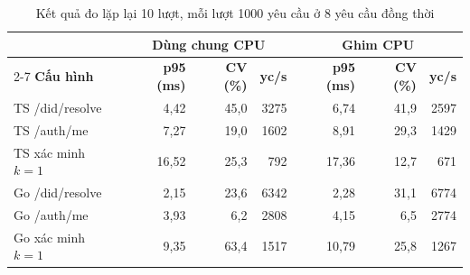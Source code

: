 \begin{table}[H]
\centering
\caption{Kết quả đo lặp lại 10 lượt, mỗi lượt 1000 yêu cầu ở 8 yêu cầu đồng thời}
\label{tab:v2-isolation}
\renewcommand{\arraystretch}{1.2}
\small
\begin{tabular}{|l|r|r|r|r|r|r|}
\hline
& \multicolumn{3}{c|}{\textbf{Dùng chung CPU}} & \multicolumn{3}{c|}{\textbf{Ghim CPU}} \\ \cline{2-7}
\textbf{Cấu hình} & \textbf{p95 (ms)} & \textbf{CV (\%)} & \textbf{yc/s} & \textbf{p95 (ms)} & \textbf{CV (\%)} & \textbf{yc/s} \\ \hline
TS /did/resolve & 4{,}42 & 45{,}0 & 3275 & 6{,}74 & 41{,}9 & 2597 \\ \hline
TS /auth/me & 7{,}27 & 19{,}0 & 1602 & 8{,}91 & 29{,}3 & 1429 \\ \hline
TS xác minh $k{=}1$ & 16{,}52 & 25{,}3 & 792 & 17{,}36 & 12{,}7 & 671 \\ \hline
Go /did/resolve & 2{,}15 & 23{,}6 & 6342 & 2{,}28 & 31{,}1 & 6774 \\ \hline
Go /auth/me & 3{,}93 & 6{,}2 & 2808 & 4{,}15 & 6{,}5 & 2774 \\ \hline
Go xác minh $k{=}1$ & 9{,}35 & 63{,}4 & 1517 & 10{,}79 & 25{,}8 & 1267 \\ \hline
\end{tabular}
\end{table}
